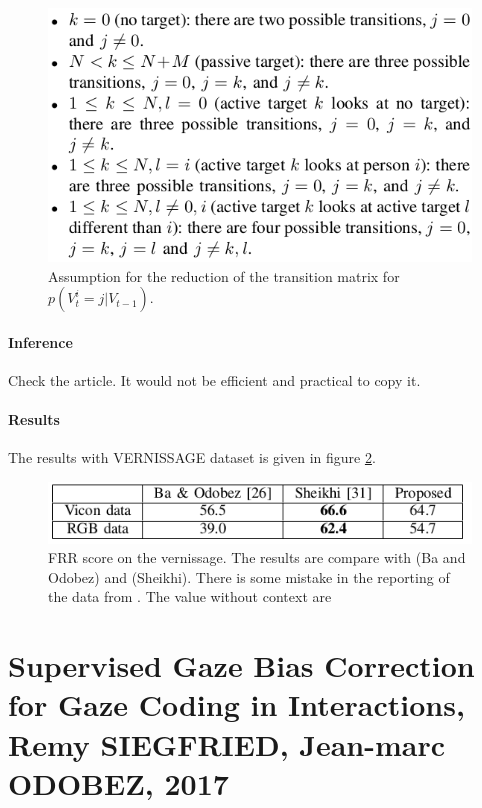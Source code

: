 \documentclass[11pt,a4paper]{article}
\begin{document}
\begin{figure}[!ht]
\centering
\includegraphics[scale=0.5]{./Pictures/TransitionMatrix_Ba.png}
\caption{Assumption for the reduction of the transition matrix for $p(V_t^i=j |V_{t-1})$. \label{TransitionMatrix_Ba}}
\end{figure}

\paragraph{Inference}
Check the article. It would not be efficient and practical to copy it.
\paragraph{Results}
The results with VERNISSAGE dataset is given in figure \ref{Results_BaMasse}.

\begin{figure}[!ht]
\centering
\includegraphics[scale=0.5]{./Pictures/Results_BaMasse.png}
\caption{FRR score on the vernissage. The results are compare with \cite{Ba2009} (Ba and Odobez) and \cite{Sheikhi2O15} (Sheikhi). There is some mistake in the reporting of the data from \cite{Sheikhi2O15}. The value without context are  \label{Results_BaMasse}}
\end{figure}

\clearpage
\section{Supervised Gaze Bias Correction for Gaze Coding in Interactions, Remy SIEGFRIED, Jean-marc ODOBEZ, 2017}
\end{document}
